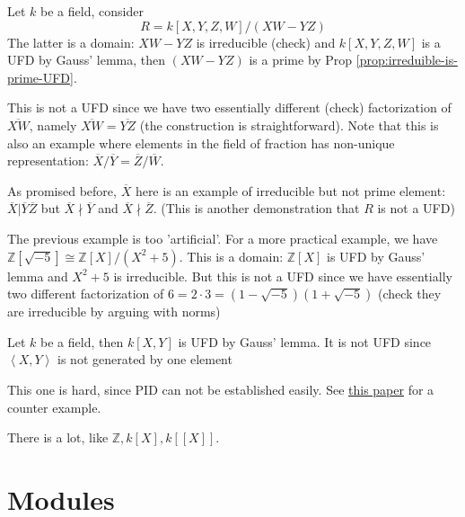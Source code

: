 \documentclass{note-eng}
\begin{document}
\begin{example}
    Let $k$ be a field, consider
    $$R = k[X, Y, Z, W] / (XW - YZ)$$
    The latter is a domain: $XW - YZ$ is irreducible (check) and $k[X, Y, Z, W]$ is a UFD by Gauss' lemma, then $(XW - YZ)$ is a prime by Prop \ref{prop:irreduible-is-prime-UFD}.

    This is not a UFD since we have two essentially different (check) factorization of $\overline{XW}$, namely $\overline{XW} = \overline{YZ}$ (the construction is straightforward). Note that this is also an example where elements in the field of fraction has non-unique representation: $\overline{X} / \overline{Y} = \overline{Z} / \overline{W}$.

    As promised before, $\overline{X}$ here is an example of irreducible but not prime element: $\overline{X} | \overline{Y} \overline{Z}$ but $\overline{X} \nmid \overline{Y}$ and $\overline{X} \nmid \overline{Z}$. (This is another demonstration that $R$ is not a UFD)
\end{example}

\begin{example}
    The previous example is too 'artificial'. For a more practical example, we have $\mathbb{Z}[\sqrt{-5}] \cong \mathbb{Z}[X] / (X^2 + 5)$. This is a domain: $\mathbb{Z}[X]$ is UFD by Gauss' lemma and $X^2 + 5$ is irreducible. But this is not a UFD since we have essentially two different factorization of $6 = 2 \cdot 3 = (1 - \sqrt{-5})(1 + \sqrt{-5})$ (check they are irreducible by arguing with norms)
\end{example}

\begin{example}
    Let $k$ be a field, then $k[X, Y]$ is UFD by Gauss' lemma. It is not UFD since $\left\langle X, Y \right\rangle$ is not generated by one element
\end{example}

\begin{example}
    This one is hard, since PID can not be established easily. See \href{https://www.emis.de/journals/NSJOM/Papers/38_1/NSJOM_38_1_137_154.pdf}{this paper} for a counter example.
\end{example}

\begin{example}
    There is a lot, like $\mathbb{Z}, k[X], k[[X]]$.
\end{example}

\section{Modules}
\end{document}
